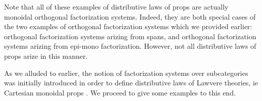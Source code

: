 Note that all of these examples of distributive laws of props are actually  monoidal orthogonal factorization systems.  Indeed, they are both special cases of the two examples of orthogonal factorization systems which we provided earlier: orthogonal factorization systems arizing from spans, and orthogonal factorization systems arizing from epi-mono factorization.   However, not all distributive laws of props arize in this manner.


 As we alluded to earlier,  the notion of factorization systems over subcategories was initially introduced in order to define distributive laws of Lawvere theories, ie Cartesian monoidal props \cite{lawvere}. We proceed to give some examples to this end.
%
%
%
%
%
%
%
%
%
%
